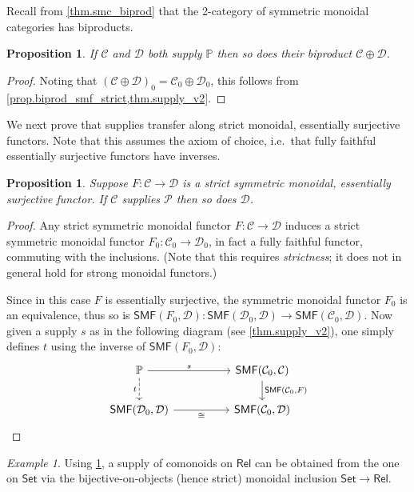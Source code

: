 \documentclass[11pt, oneside, article]{memoir}
\theoremstyle{plain}
\newtheorem{proposition}[theorem]{Proposition}
\theoremstyle{definition}
\theoremstyle{remark}
\newtheorem{example}[theorem]{Example}
\newcommand{\cat}[1]{\mathcal{#1}}%
\newcommand{\Cat}[1]{{\mathsf{#1}}}%
\newcommand{\smset}{\Cat{Set}}
\newcommand{\smf}{\Cat{SMF}}
\newcommand{\pp}{\mathbb{P}}
\newcommand{\mob}[1]{#1_0}
\newcommand{\rel}{\Cat{Rel}}
\begin{document}
Recall from \cref{thm.smc_biprod} that the 2-category of symmetric monoidal categories has biproducts.

\begin{proposition}
If $\cat{C}$ and $\cat{D}$ both supply $\pp$ then so does their biproduct $\cat{C}\oplus\cat{D}$.
\end{proposition}
\begin{proof}
Noting that $\mob{(\cat{C}\oplus \cat{D})} =\mob{\cat{C}} \oplus \mob{\cat{D}}$, this follows from \cref{prop.biprod_smf_strict,thm.supply_v2}.
\end{proof}

We next prove that supplies transfer along strict monoidal, essentially surjective functors. Note that this assumes the axiom of choice, i.e.\ that fully faithful essentially surjective functors have inverses.

\begin{proposition}\label{cor.strong_bo}
Suppose $F\colon\cat{C}\to\cat{D}$ is a strict symmetric monoidal, essentially surjective functor. If $\cat{C}$ supplies $\cat{P}$ then so does $\cat{D}$.
\end{proposition}
\begin{proof}
Any strict symmetric monoidal functor $F\colon\cat{C}\to\cat{D}$ induces a strict symmetric monoidal functor $\mob{F}\colon\mob{\cat{C}}\to\mob{\cat{D}}$, in fact a fully faithful functor, commuting with the inclusions. (Note that this requires \emph{strictness}; it does not in general hold for strong monoidal functors.) 

Since in this case $F$ is essentially surjective, the symmetric monoidal functor $\mob{F}$ is an equivalence, thus so is $\smf(\mob{F},\cat{D})\colon\smf(\mob{\cat{D}},\cat{D})\to\smf(\mob{\cat{C}},\cat{D})$. Now given a supply $s$ as in the following diagram (see \cref{thm.supply_v2}), one simply defines $t$ using the inverse of $\smf(\mob{F},\cat{D})$:
\[
\begin{tikzcd}[column sep=50pt,baseline=(W.base)]
	\pp\ar[r, "s"]\ar[d, dashed, "t"']&
	\smf(\mob{\cat{C}},\cat{C})\ar[d, "{\smf(\mob{\cat{C}},F)}"]\\
	\smf(\mob{\cat{D}},\cat{D})\ar[r, "\cong"']& |[alias=W]|
	\smf(\mob{\cat{C}},\cat{D})
\end{tikzcd}
\qedhere
\]
\end{proof}

\begin{example}
Using \cref{cor.strong_bo}, a supply of comonoids on $\rel$ can be obtained from the one on $\smset$ via the bijective-on-objects (hence strict) monoidal inclusion $\smset\to\rel$.
\end{example}
\end{document}

